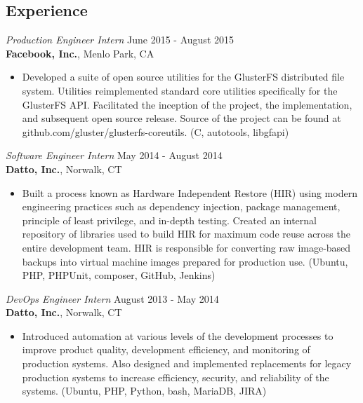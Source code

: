 \documentclass[margin]{res}
\begin{document}
\begin{resume}
\section{Experience}

{\sl Production Engineer Intern} \hfill June 2015 - August 2015 \\
\textbf{Facebook, Inc.}, Menlo Park, CA
\begin{itemize}
    \item[] Developed a suite of open source utilities for the GlusterFS
          distributed file system. Utilities reimplemented standard core
          utilities specifically for the GlusterFS API. Facilitated the
          inception of the project, the implementation, and subsequent open
          source release. Source of the project can be found at
          github.com/gluster/glusterfs-coreutils.
          (C, autotools, libgfapi)
\end{itemize}

{\sl Software Engineer Intern} \hfill May 2014 - August 2014 \\
\textbf{Datto, Inc.}, Norwalk, CT
\begin{itemize}
    \item[] Built a process known as Hardware Independent Restore (HIR) using
          modern engineering practices such as dependency injection, package
          management, principle of least privilege, and in-depth testing.
          Created an internal repository of libraries used to build HIR for
          maximum code reuse across the entire development team. HIR is
          responsible for converting raw image-based backups into virtual
          machine images prepared for production use.
          (Ubuntu, PHP, PHPUnit, composer, GitHub, Jenkins)
\end{itemize}

{\sl DevOps Engineer Intern} \hfill August 2013 - May 2014 \\
\textbf{Datto, Inc.}, Norwalk, CT
\begin{itemize}
    \item[] Introduced automation at various levels of the development
          processes to improve product quality, development efficiency, and
          monitoring of production systems. Also designed and implemented
          replacements for legacy production systems to increase efficiency,
          security, and reliability of the systems.
          (Ubuntu, PHP, Python, bash, MariaDB, JIRA)
\end{itemize}
 

\end{resume}
\end{document}
